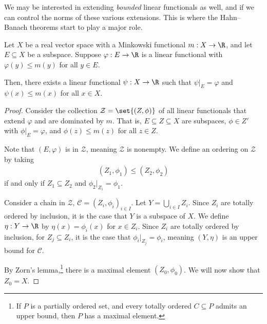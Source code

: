 \documentclass[10pt]{mypackage}
\begin{document}
  We may be interested in extending \textit{bounded} linear functionals as well, and if we can control the norms of these various extensions. This is where the Hahn--Banach theorems start to play a major role.
  \begin{theorem}
    Let $X$ be a real vector space with a Minkowski functional $m: X\rightarrow \R$, and let $E\subseteq X$ be a subspace. Suppose $\varphi: E\rightarrow \R$ is a linear functional with $\varphi(y) \leq m(y)$ for all $y\in E$.\newline

    Then, there exists a linear functional $\psi: X\rightarrow \R$ such that $\psi|_{E} = \varphi$ and $\psi(x)\leq m(x)$ for all $x\in X$.
  \end{theorem}
  \begin{proof}
    Consider the collection $\mathcal{Z} = \set{\left(Z,\phi\right)}$ of all linear functionals that extend $\varphi$ and are dominated by $m$. That is, $E\subseteq Z\subseteq X$ are subspaces, $\phi\in Z'$ with $\phi|_{E} = \varphi$, and $\phi(z) \leq m(z)$ for all $z\in Z$.\newline

    Note that $\left(E,\varphi\right)$ is in $\mathcal{Z}$, meaning $\mathcal{Z}$ is nonempty. We define an ordering on $\mathcal{Z}$ by taking
    \begin{align*}
      \left(Z_1,\phi_1\right)\leq \left(Z_2,\phi_2\right)
    \end{align*}
    if and only if $Z_1\subseteq Z_2$ and $\phi_2|_{Z_1} = \phi_1$.\newline

    Consider a chain in $\mathcal{Z}$, $\mathcal{C} = \left(Z_i,\phi_i\right)_{i\in I}$. Let $Y = \bigcup_{i\in I}Z_i$. Since $Z_i$ are totally ordered by inclusion, it is the case that $Y$ is a subspace of $X$. We define $\eta: Y\rightarrow \R$ by $\eta(x) = \phi_i(x)$ for $x\in Z_i$. Since $Z_i$ are totally ordered by inclusion, for $Z_j\subseteq Z_i$, it is the case that $\phi_{i}|_{Z_j} = \phi_i$, meaning $\left(Y,\eta\right)$ is an upper bound for $\mathcal{C}$.\newline

    By Zorn's lemma,\footnote{If $P$ is a partially ordered set, and every totally ordered $C\subseteq P$ admits an upper bound, then $P$ has a maximal element.} there is a maximal element $\left(Z_0,\phi_0\right)$. We will now show that $Z_0 = X$.\newline


\end{proof}
\end{document}
